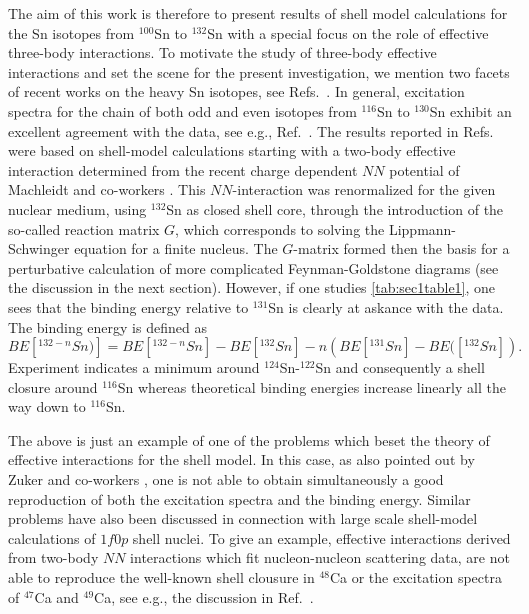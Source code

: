 The aim of this work is therefore to present 
results of shell model calculations 
for the Sn isotopes from $^{100}$Sn to $^{132}$Sn
with a special focus on the role of effective 
three-body interactions. 
To motivate the study of three-body effective interactions and 
set the scene for the present investigation, we mention 
two facets of recent works on
the heavy Sn isotopes, see Refs.\ \cite{tin98a,tin98b}. 
In general, 
excitation spectra for the chain of both odd and
even isotopes from  
$^{116}$Sn to $^{130}$Sn exhibit an excellent agreement
with the data, see e.g., Ref.\ \cite{tin98a}.
The  results reported in Refs.\ \cite{tin98a,tin98b} were 
based on shell-model calculations starting with
a two-body effective interaction determined from the 
recent charge dependent $NN$ potential of Machleidt
and co-workers \cite{cdbonn96}. This $NN$-interaction
was renormalized for the given nuclear medium, using $^{132}$Sn as closed
shell core, through
the introduction of the so-called reaction matrix $G$,
which corresponds to solving the Lippmann-Schwinger
equation for a finite nucleus. The $G$-matrix formed then
the basis for a perturbative calculation of more complicated
Feynman-Goldstone diagrams (see the discussion in
the next section). 
However, if one studies  \ref{tab:sec1table1},
one sees that the binding energy relative to $^{131}$Sn  
is clearly at askance with the data. 
The binding energy is defined as
\begin{equation}
      BE[^{132 - n}Sn)] = BE[^{132 - n}Sn] - BE[^{132}Sn] 
      - n  \left (BE[^{131}Sn] -  BE([^{132}Sn] \right ).
\end{equation}
Experiment indicates a minimum around $^{124}$Sn-$^{122}$Sn and consequently
a shell closure around $^{116}$Sn whereas theoretical 
binding energies increase linearly all the way 
down to $^{116}$Sn. 

The above is just an example of one of the problems which beset the theory
of effective interactions for the shell model. In this case, as also
pointed out by Zuker and co-workers \cite{andres94,andres96,andres98},
one is not able to obtain simultaneously a good reproduction
of both the excitation spectra and the binding energy. Similar problems
have also been discussed in connection with large scale shell-model
calculations of $1f0p$ shell nuclei. To give an example, effective
interactions derived from two-body $NN$ interactions which fit 
nucleon-nucleon scattering data, are not able to reproduce the 
well-known shell clousure in $^{48}$Ca or the excitation spectra 
of $^{47}$Ca and $^{49}$Ca, see e.g., the discussion in Ref.\ \cite{hko95}.

